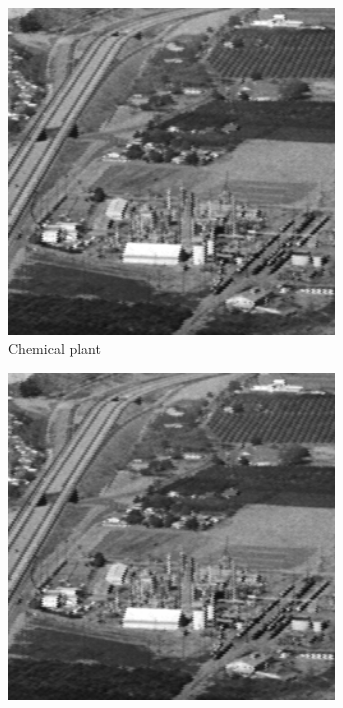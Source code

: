 \begin{figure}
\begin{subfigure}[b]{.23\textwidth}
  \centering
  \includegraphics[width=0.95\textwidth]{figures/test-images/original/chemicalplant}
  \caption{Chemical plant}
  \label{fig:test-images-chemicalplant}
\end{subfigure}
\begin{subfigure}[b]{.23\textwidth}
  \centering
  \includegraphics[width=0.95\textwidth]{figures/test-images/truncate1/chemicalplant}

\end{subfigure}
\end{figure}
